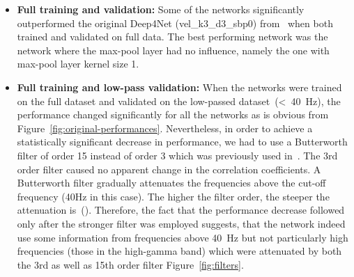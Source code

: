 \begin{itemize}
    \item \textbf{Full training and validation:} Some of the networks significantly outperformed the original Deep4Net (vel\_k3\_d3\_sbp0) from~\cite{Hammer-2021} when both trained and validated on full data.
    The best performing network was the network where the max-pool layer had no influence, namely the one with max-pool layer kernel size 1.
    
    \item \textbf{Full training and low-pass validation:} When the networks were trained on the full dataset and validated on the low-passed dataset~(<~40~Hz), the performance changed significantly for all the networks as is obvious from Figure~\ref{fig:original-performances}.
    Nevertheless, in order to achieve a statistically significant decrease in performance, we had to use a Butterworth filter of order 15 instead of order 3 which was previously used in~\cite{Hammer-2021}.
    The 3rd order filter caused no apparent change in the correlation coefficients.
    A Butterworth filter gradually attenuates the frequencies above the cut-off frequency (40Hz in this case).
    The higher the filter order, the steeper the attenuation is~(\cite{butterworth1930theory}).
    Therefore, the fact that the performance decrease followed only after the stronger filter was employed suggests, that the network indeed use some information from frequencies above 40~Hz but not particularly high frequencies (those in the high-gamma band) which were attenuated by both the 3rd as well as 15th order filter Figure~\ref{fig:filters}.
    

\end{itemize}
